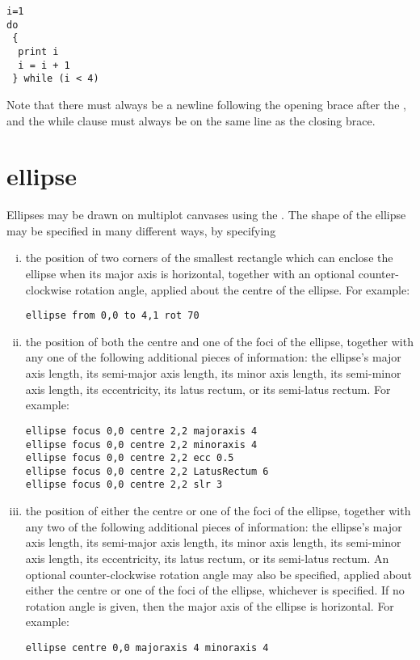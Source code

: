 \begin{verbatim}
i=1
do
 {
  print i
  i = i + 1
 } while (i < 4)
\end{verbatim}

\noindent Note that there must always be a newline following the opening brace
after the , and the while clause must always be on the same line as
the closing brace.


\section{ellipse}

Ellipses may be drawn on multiplot canvases using the . The shape
of the ellipse may be specified in many different ways, by specifying

\begin{enumerate}[(i)]
\item the position of two corners of the smallest rectangle which can enclose
the ellipse when its major axis is horizontal, together with an optional
counter-clockwise rotation angle, applied about the centre of the ellipse.
For example:

\begin{verbatim}
ellipse from 0,0 to 4,1 rot 70
\end{verbatim}

\item the position of both the centre and one of the foci of the ellipse,
together with any one of the following additional pieces of information: the
ellipse's major axis length, its semi-major axis length, its minor axis length,
its semi-minor axis length, its eccentricity, its latus rectum, or its
semi-latus rectum.  For example:

\begin{verbatim}
ellipse focus 0,0 centre 2,2 majoraxis 4
ellipse focus 0,0 centre 2,2 minoraxis 4
ellipse focus 0,0 centre 2,2 ecc 0.5
ellipse focus 0,0 centre 2,2 LatusRectum 6
ellipse focus 0,0 centre 2,2 slr 3
\end{verbatim}

\item the position of either the centre or one of the foci of the ellipse,
together with any two of the following additional pieces of information: the
ellipse's major axis length, its semi-major axis length, its minor axis length,
its semi-minor axis length, its eccentricity, its latus rectum, or its
semi-latus rectum. An optional counter-clockwise rotation angle may also be
specified, applied about either the centre or one of the foci of the ellipse,
whichever is specified. If no rotation angle is given, then the major axis of
the ellipse is horizontal.  For example:

\begin{verbatim}
ellipse centre 0,0 majoraxis 4 minoraxis 4
\end{verbatim}
\end{enumerate}

